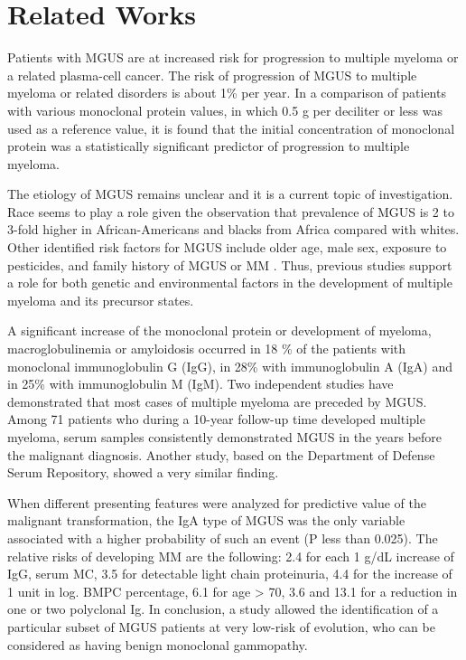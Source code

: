\documentclass[conference]{IEEEtran}
\begin{document}
\section{Related Works}
\par
Patients with MGUS are at increased risk for progression to multiple myeloma or a related plasma-cell cancer. The risk of progression of MGUS to multiple myeloma or related disorders is about 1\% per year. \cite{monoclonal1,monoclonal2} In a comparison of patients with various monoclonal protein values, in which 0.5 g per deciliter or less was used as a reference value, it is found that the initial concentration of monoclonal protein was a statistically significant predictor of progression to multiple myeloma.

\par

The etiology of MGUS remains unclear and it is a current topic of investigation. Race seems to play a role given the observation that prevalence of MGUS is 2 to 3-fold higher in African-Americans and blacks from Africa compared with whites. \cite{monoclonal6, monoclonal7} Other identified risk factors for MGUS include older age, male sex, exposure to pesticides, and family history of MGUS or MM \cite{monoclonal9,monoclonal10,monoclonal11}. Thus, previous studies support a role for both genetic and environmental factors in the development of multiple myeloma and its precursor states. \cite{monoclonal12}

\par

A significant increase of the monoclonal protein or development of myeloma, macroglobulinemia or amyloidosis occurred in 18 \% of the patients with monoclonal immunoglobulin G (IgG), in 28\% with immunoglobulin A (IgA) and in 25\% with immunoglobulin M (IgM). \cite{monoclonal2} Two independent studies have demonstrated that most cases of multiple myeloma are preceded by MGUS. Among 71 patients who during a 10-year follow-up time developed multiple myeloma, serum samples consistently demonstrated MGUS in the years before the malignant diagnosis. \cite{monoclonal13} Another study, based on the Department of Defense Serum Repository, showed a very similar finding. \cite{monoclonal14}

\par

When different presenting features were analyzed for predictive value of the malignant transformation, the IgA type of MGUS was the only variable associated with a higher probability of such an event (P less than 0.025). \cite{monoclonal4} The relative risks of developing MM are the following: 2.4 for each 1 g/dL increase of IgG, serum MC, 3.5 for detectable light chain proteinuria, 4.4 for the increase of 1 unit in log. BMPC percentage, 6.1 for age \textgreater \hspace{0.1cm}  70, 3.6 and 13.1 for a reduction in one or two polyclonal Ig. In conclusion, a study allowed the identification of a particular subset of MGUS patients at very low-risk of evolution, who can be considered as having benign monoclonal gammopathy. \cite{monoclonal5}
\end{document}

